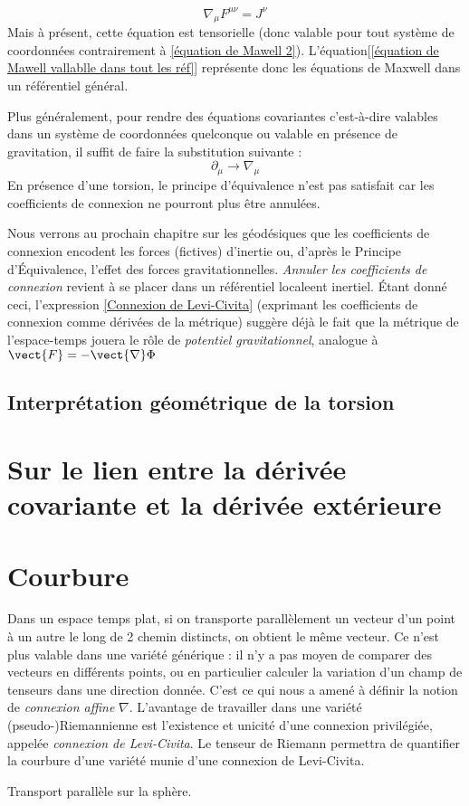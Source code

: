  \begin{equation}
     \nabla_{\mu} F^{\mu \nu} = J^{\nu}
     \label{équation de Mawell vallablle dans tout les réf}
 \end{equation}
 Mais à présent, cette équation est tensorielle (donc valable pour tout système de coordonnées contrairement à \ref{équation de Mawell 2}). L'équation[\ref{équation de Mawell vallablle dans tout les réf}] représente donc les équations de Maxwell dans un référentiel général. 

 Plus généralement, pour rendre des équations covariantes c'est-à-dire valables dans un système de coordonnées quelconque ou valable en présence de gravitation, il suffit de faire la substitution suivante :
 \begin{equation}
     \partial_{\mu} \rightarrow \nabla_{\mu}
 \end{equation}
En présence d'une torsion, le principe d'équivalence n'est pas satisfait car les coefficients de connexion ne pourront plus être annulées. 

Nous verrons au prochain chapitre sur les géodésiques que les coefficients de connexion encodent les forces (fictives) d'inertie ou, d'après le Principe d'Équivalence, l'effet des forces gravitationnelles. \emph{Annuler les coefficients de connexion} revient à se placer dans un référentiel localeent inertiel. Étant donné ceci, l'expression \ref{Connexion de Levi-Civita} (exprimant les coefficients de connexion comme dérivées de la métrique) suggère déjà le fait que la métrique de l'espace-temps jouera le rôle de \emph{potentiel gravitationnel}, analogue à $\vect{F} = - \vect{\nabla} \Phi$
\subsection{Interprétation géométrique de la torsion}
\section{Sur le lien entre la dérivée covariante et la dérivée extérieure}
\section{Courbure}
Dans un espace temps plat, si on transporte parallèlement un vecteur d'un point à un autre le long de 2 chemin distincts, on obtient le même vecteur. Ce n'est plus valable dans une variété générique : il n'y a pas moyen de comparer des vecteurs en différents points, ou en particulier calculer la variation d'un champ de tenseurs dans une direction donnée. C'est ce qui nous a amené à définir la notion de \emph{connexion affine} $\nabla$. L'avantage de travailler dans une variété (pseudo-)Riemannienne est l'existence et unicité d'une connexion privilégiée, appelée \emph{connexion de Levi-Civita}. Le tenseur de Riemann permettra de quantifier la courbure d'une variété munie d'une connexion de Levi-Civita.
\begin{exmp}
    Transport parallèle sur la sphère.
\end{exmp}

